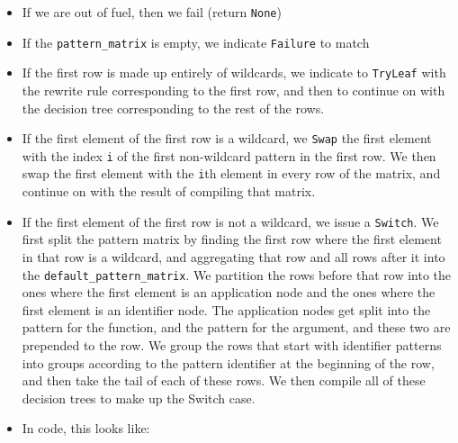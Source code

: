 \documentclass[
]{article}
\begin{document}
\begin{itemize}
\begin{itemize}
\begin{itemize}
      \begin{itemize}
      \item
        If we are out of fuel, then we fail (return \texttt{None})
      \item
        If the \texttt{pattern\_matrix} is empty, we indicate
        \texttt{Failure} to match
      \item
        If the first row is made up entirely of wildcards, we indicate
        to \texttt{TryLeaf} with the rewrite rule corresponding to the
        first row, and then to continue on with the decision tree
        corresponding to the rest of the rows.
      \item
        If the first element of the first row is a wildcard, we
        \texttt{Swap} the first element with the index \texttt{i} of the
        first non-wildcard pattern in the first row. We then swap the
        first element with the \texttt{i}th element in every row of the
        matrix, and continue on with the result of compiling that
        matrix.
      \item
        If the first element of the first row is not a wildcard, we
        issue a \texttt{Switch}. We first split the pattern matrix by
        finding the first row where the first element in that row is a
        wildcard, and aggregating that row and all rows after it into
        the \texttt{default\_pattern\_matrix}. We partition the rows
        before that row into the ones where the first element is an
        application node and the ones where the first element is an
        identifier node. The application nodes get split into the
        pattern for the function, and the pattern for the argument, and
        these two are prepended to the row. We group the rows that start
        with identifier patterns into groups according to the pattern
        identifier at the beginning of the row, and then take the tail
        of each of these rows. We then compile all of these decision
        trees to make up the Switch case.
      \item
        In code, this looks like:


\end{itemize}
\end{itemize}
\end{itemize}
\end{itemize}
\end{document}
